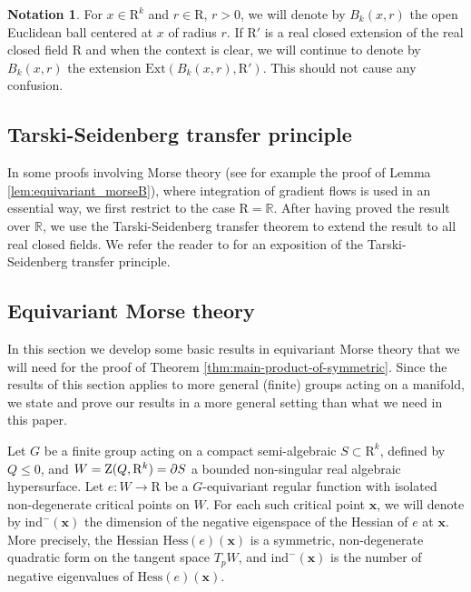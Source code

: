 \documentclass{amsart}
\theoremstyle{definition}
\newtheorem{notation}{Notation}
\theoremstyle{remark}
\numberwithin{equation}{section}
\begin{document}
\begin{notation}
  For $x \in {\mathrm{R}}^{k}$ and $r \in {\mathrm{R}}$, $r>0$, we will denote by $B_{k} (x,r)$
  the open Euclidean ball centered at $x$ of radius $r$. If ${\mathrm{R}}'$ is a real
  closed extension of the real closed field ${\mathrm{R}}$ and when the context is
  clear, we will continue to denote by $B_{k} (x,r)$ the extension ${\mathrm{Ext}}
  \left(B_{k} (x,r) , {\mathrm{R}}' \right)$. This should not cause any confusion.
\end{notation}

\subsection{Tarski-Seidenberg transfer principle}
In some proofs involving
Morse theory (see for example the proof of Lemma \ref{lem:equivariant_morseB}), where integration of gradient flows is used in an essential way, we
first restrict to the case ${\mathrm{R}} =\mathbb{R}$. After having proved the result
over $\mathbb{R}$, we use the Tarski-Seidenberg transfer theorem to extend
the result to all real closed fields. We refer the reader to 
{\cite[Chapter 2]{BPRbook2}} for an exposition of the Tarski-Seidenberg transfer
principle.

\subsection{Equivariant Morse theory}
\label{subsec:equivariant-morse-theory}

In this section we develop some basic results in equivariant Morse theory that we will need for the proof of 
Theorem \ref{thm:main-product-of-symmetric}. Since the results of this section applies to more general (finite) groups
acting on a manifold, we state and prove our results in a more general setting than what we need in this paper.

Let $G$ be a finite group acting on a compact semi-algebraic $S \subset {\mathrm{R}}^k$, 
defined by $Q \leq 0$, and $W = {{\rm Z}}(Q,{\mathrm{R}}^k) = \partial S$ a
bounded non-singular real algebraic hypersurface.  
Let $e:W \rightarrow {\mathrm{R}}$ be a $G$-equivariant regular 
function with isolated  non-degenerate critical points on $W$.
For each such critical point ${\mathbf{x}}$, we will denote by ${\mathrm{ind}}^-({\mathbf{x}})$ the dimension of the negative eigenspace
of the Hessian of $e$ at ${\mathbf{x}}$. More precisely, the Hessian $\mathrm{Hess}(e)({\mathbf{x}})$ is a symmetric, non-degenerate quadratic form
on the tangent space $T_p W$, and ${\mathrm{ind}}^-({\mathbf{x}})$ is the number of negative eigenvalues of $\mathrm{Hess}(e)({\mathbf{x}})$. 
\end{document}
